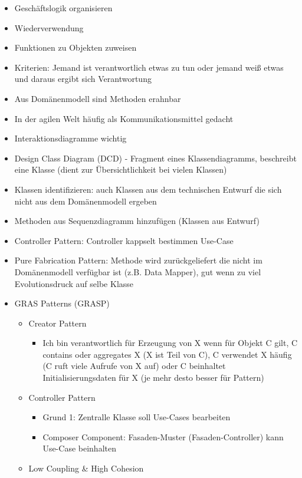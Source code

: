 \documentclass[paper=a4, fontsize=11pt]{scrartcl} %
\numberwithin{equation}{section} %
\numberwithin{figure}{section} %
\numberwithin{table}{section} %
\begin{document}
\begin{itemize}
  \item Geschäftslogik organisieren
  \item Wiederverwendung
  \item Funktionen zu Objekten zuweisen
  \item Kriterien: Jemand ist verantwortlich etwas zu tun oder jemand weiß etwas und daraus ergibt sich Verantwortung
  \item Aus Domänenmodell sind Methoden erahnbar
  \item In der agilen Welt häufig als Kommunikationsmittel gedacht
  \item Interaktionsdiagramme wichtig
  \item Design Class Diagram (DCD) - Fragment eines Klassendiagramms, beschreibt eine Klasse (dient zur Übersichtlichkeit bei vielen Klassen)
  \item Klassen identifizieren: auch Klassen aus dem technischen Entwurf die sich nicht aus dem Domänenmodell ergeben
  \item Methoden aus Sequenzdiagramm hinzufügen (Klassen aus Entwurf)
  \item Controller Pattern: Controller kappselt bestimmen Use-Case
  \item Pure Fabrication Pattern: Methode wird zurückgeliefert die nicht im Domänenmodell verfügbar ist (z.B. Data Mapper), gut wenn zu viel Evolutionsdruck auf selbe Klasse
  \item GRAS Patterns (GRASP)
  \begin{itemize}
    \item Creator Pattern
    \begin{itemize}
      \item Ich bin verantwortlich für Erzeugung von X wenn für Objekt C gilt, C contains oder aggregates X (X ist Teil von C), C verwendet X häufig (C ruft viele Aufrufe von X auf) oder C beinhaltet Initialisierungsdaten für X (je mehr desto besser für Pattern)
    \end{itemize}
    \item Controller Pattern
    \begin{itemize}
      \item Grund 1: Zentralle Klasse soll Use-Cases bearbeiten
      \item Composer Component: Fasaden-Muster (Fasaden-Controller) kann Use-Case beinhalten
    \end{itemize}
    \item Low Coupling \& High Cohesion
    \begin{itemize}

\end{itemize}
\end{itemize}
\end{itemize}
\end{document}
